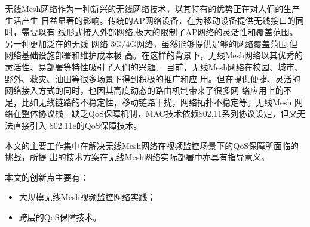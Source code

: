\begin{cabstract}
  无线Mesh网络作为一种新兴的无线网络技术，以其特有的优势正在对人们的生产生活产生
  日益显著的影响。传统的AP网络设备，在为移动设备提供无线接口的同时，需要以有
  线形式接入外部网络,极大的限制了AP网络的灵活性和覆盖范围。另一种更加泛在的无线
  网络-3G/4G网络，虽然能够提供足够的网络覆盖范围,但网络基础设施部署和维护成本极
  高。在这样的背景下，无线Mesh网络以其优秀的灵活性、易部署等特性吸引了人们的兴趣。
  目前，无线Mesh网络在校园、城市、野外、救灾、油田等很多场景下得到积极的推广和应
  用。但在提供便捷、灵活的网络接入方式的同时，也因其高度动态的路由机制带来了很多网
  络应用上的不足，比如无线链路的不稳定性，移动链路干扰，网络拓扑不稳定等。无线Mesh
  网络在整体协议栈上缺乏QoS保障机制，MAC技术依赖802.11系列协议设定，但又无法直接引入
  802.11e的QoS保障技术。

  本文的主要工作集中在解决无线Mesh网络在视频监控场景下的QoS保障所面临的挑战，所提
  出的技术方案在无线Mesh网络实际部署中亦具有指导意义。

  本文的创新点主要有：
  \begin{itemize}
    \item 大规模无线Mesh视频监控网络实践；
    \item 跨层的QoS保障技术。
  \end{itemize}

\end{cabstract}


